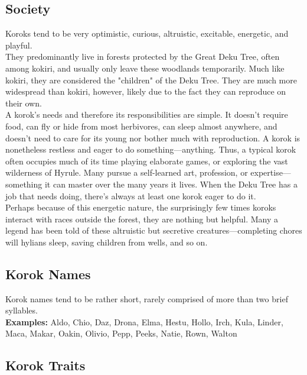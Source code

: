 \documentclass[10pt,twoside,twocolumn,openany]{book}
\begin{document}
\subsection{Society}

Koroks tend to be very optimistic, curious, altruistic, excitable, energetic, and playful.\\
They predominantly live in forests protected by the Great Deku Tree, often among kokiri, and usually only leave these woodlands temporarily. Much like kokiri, they are considered the "children" of the Deku Tree. They are much more widespread than kokiri, however, likely due to the fact they can reproduce on their own.\\
A korok's needs and therefore its responsibilities are simple. It doesn't require food, can fly or hide from most herbivores, can sleep almost anywhere, and doesn't need to care for its young nor bother much with reproduction. A korok is nonetheless restless and eager to do something—anything. Thus, a typical korok often occupies much of its time playing elaborate games, or exploring the vast wilderness of Hyrule. Many pursue a self-learned art, profession, or expertise—something it can master over the many years it lives. When the Deku Tree has a job that needs doing, there's always at least one korok eager to do it.\\
Perhaps because of this energetic nature, the surprisingly few times koroks interact with races outside the forest, they are nothing but helpful. Many a legend has been told of these altruistic but secretive creatures—completing chores will hylians sleep, saving children from wells, and so on.\\

\subsection{Korok Names}

Korok names tend to be rather short, rarely comprised of more than two brief syllables.\\
\textbf{Examples:} Aldo, Chio, Daz, Drona, Elma, Hestu, Hollo, Irch, Kula, Linder, Maca, Makar, Oakin, Olivio, Pepp, Peeks, Natie, Rown, Walton 

\subsection{Korok Traits}
\end{document}
